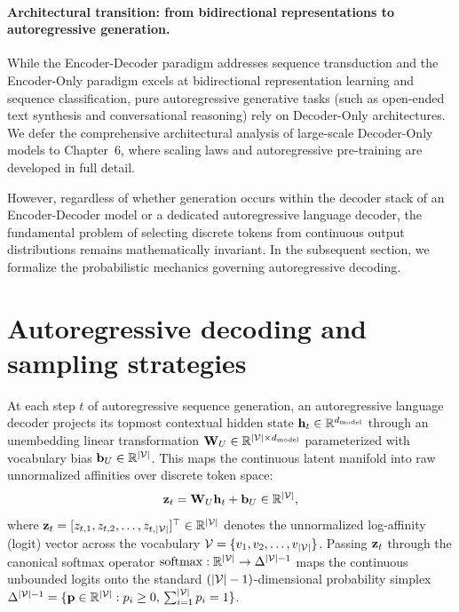 \documentclass[../../main.tex]{subfiles}
\begin{document}
\paragraph{Architectural transition: from bidirectional representations to autoregressive generation.}
While the Encoder-Decoder paradigm addresses sequence transduction and the Encoder-Only paradigm excels at bidirectional representation learning and sequence classification, pure autoregressive generative tasks (such as open-ended text synthesis and conversational reasoning) rely on Decoder-Only architectures. We defer the comprehensive architectural analysis of large-scale Decoder-Only models to Chapter~6, where scaling laws and autoregressive pre-training are developed in full detail.

However, regardless of whether generation occurs within the decoder stack of an Encoder-Decoder model or a dedicated autoregressive language decoder, the fundamental problem of selecting discrete tokens from continuous output distributions remains mathematically invariant. In the subsequent section, we formalize the probabilistic mechanics governing autoregressive decoding.

\clearpage
\section{Autoregressive decoding and sampling strategies}
\label{sec:decoding_and_sampling}

At each step $t$ of autoregressive sequence generation, an autoregressive language decoder projects its topmost contextual hidden state $\mathbf{h}_t \in \mathbb{R}^{d_{\text{model}}}$ through an unembedding linear transformation $\mathbf{W}_U \in \mathbb{R}^{|\mathcal{V}| \times d_{\text{model}}}$ parameterized with vocabulary bias $\mathbf{b}_U \in \mathbb{R}^{|\mathcal{V}|}$. This maps the continuous latent manifold into raw unnormalized affinities over discrete token space:
\begin{equation}
\label{eq:unembedding_projection_formal}
\mathbf{z}_t = \mathbf{W}_U \mathbf{h}_t + \mathbf{b}_U \in \mathbb{R}^{|\mathcal{V}|},
\end{equation}
where $\mathbf{z}_t = [z_{t, 1}, z_{t, 2}, \dots, z_{t, |\mathcal{V}|}]^\top \in \mathbb{R}^{|\mathcal{V}|}$ denotes the unnormalized log-affinity (logit) vector across the vocabulary $\mathcal{V} = \{v_1, v_2, \dots, v_{|\mathcal{V}|}\}$. Passing $\mathbf{z}_t$ through the canonical softmax operator $\operatorname{softmax}: \mathbb{R}^{|\mathcal{V}|} \to \Delta^{|\mathcal{V}|-1}$ maps the continuous unbounded logits onto the standard $(|\mathcal{V}|-1)$-dimensional probability simplex $\Delta^{|\mathcal{V}|-1} = \{\mathbf{p} \in \mathbb{R}^{|\mathcal{V}|} : p_i \ge 0, \, \sum_{i=1}^{|\mathcal{V}|} p_i = 1\}$. 
\end{document}
